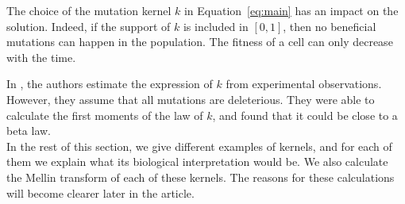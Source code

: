     The choice of the mutation kernel $k$ in Equation~\eqref{eq:main} has an impact on the solution. Indeed, if the support of $k$ is included in $[0, 1]$, then no beneficial mutations can happen in the population. The fitness of a cell can only decrease with the time. 

    In \cite{robert2018mutation}, the authors estimate the expression of $k$ from experimental observations. However, they assume that all mutations are deleterious. They were able to calculate the first moments of the law of $k$, and found that it could be close to a beta law. \\

    In the rest of this section, we give different examples of kernels, and for each of them we explain what its biological interpretation would be. We also calculate the Mellin transform of each of these kernels. The reasons for these calculations will become clearer later in the article. \\


